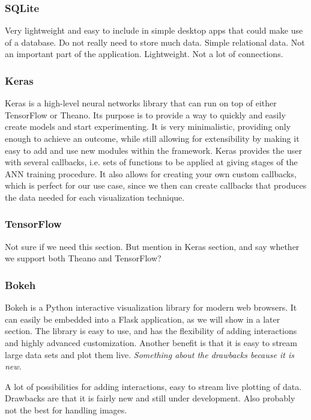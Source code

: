 \subsubsection{SQLite}

Very lightweight and easy to include in simple desktop apps that could make use of a database. Do not really need to store much data. Simple relational data. Not an important part of the application. Lightweight. Not a lot of connections.

\subsubsection{Keras}

Keras is a high-level neural networks library that can run on top of either TensorFlow or Theano. Its purpose is to provide a way to quickly and easily create models and start experimenting. It is very minimalistic, providing only enough to achieve an outcome, while still allowing for extensibility by making it easy to add and use new modules within the framework. Keras provides the user with several callbacks, i.e. sets of functions to be applied at giving stages of the ANN training procedure. It also allows for creating your own custom callbacks, which is perfect for our use case, since we then can create callbacks that produces the data needed for each visualization technique.

\subsubsection{TensorFlow}

Not sure if we need this section. But mention in Keras section, and say whether we support both Theano and TensorFlow?

\subsubsection{Bokeh}

Bokeh is a Python interactive visualization library for modern web browsers. It can easily be embedded into a Flask application, as we will show in a later section. The library is easy to use, and has the flexibility of adding interactions and highly advanced customization. Another benefit is that it is easy to stream large data sets and plot them live. \textit{Something about the drawbacks because it is new.}

A lot of possibilities for adding interactions, easy to stream live plotting of data. Drawbacks are that it is fairly new and still under development. Also probably not the best for handling images.

